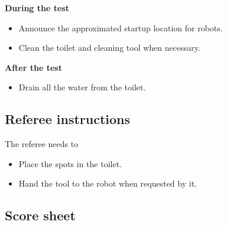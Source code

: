 \textbf{During the test}
\begin{itemize}
	\item Announce the approximated startup location for robots.
	\item Clean the toilet and cleaning tool when necessary.
\end{itemize}
\textbf{After the test}
\begin{itemize}
	\item Drain all the water from the toilet.
\end{itemize}

\subsection{Referee instructions}
The referee needs to
\begin{itemize}
	\item Place the spots in the toilet.
	\item Hand the tool to the robot when requested by it.
\end{itemize}


\newpage
\subsection{Score sheet}


